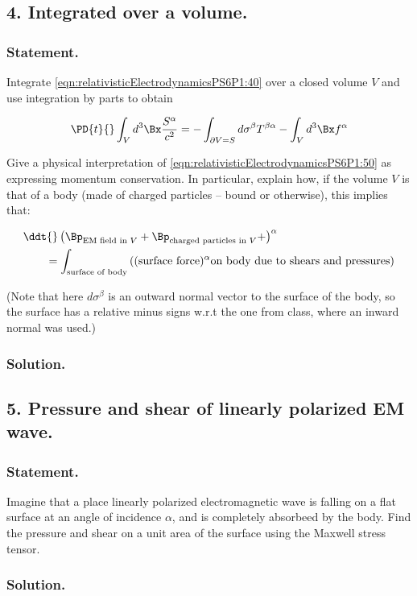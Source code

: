 \subsection{4. Integrated over a volume.}

\subsubsection{Statement.}

Integrate \ref{eqn:relativisticElectrodynamicsPS6P1:40} over a closed volume $V$ and use integration by parts to obtain

\begin{equation}\label{eqn:relativisticElectrodynamicsPS6P1:50}
\PD{t}{} \int_V d^3 \Bx \frac{S^\alpha}{c^2} 
= 
- \int_{\partial V = S} d \sigma^\beta T^{\beta \alpha} - \int_V d^3 \Bx f^\alpha 
\end{equation}

Give a physical interpretation of \ref{eqn:relativisticElectrodynamicsPS6P1:50} as expressing momentum conservation.  In particular, explain how, if the volume $V$ is that of a body (made of charged particles -- bound or otherwise), this implies that:

\begin{equation}\label{eqn:relativisticElectrodynamicsPS6P1:60}
\begin{aligned}
&\ddt{} \left( 
\Bp_{\text{EM field in $V$}} + 
\Bp_{\text{charged particles in $V$}} + 
\right)^\alpha \\
&\qquad = \int_{\text{surface of body}} \left( 
(\text{surface force})^\alpha \text{on body due to shears and pressures}
\right)
\end{aligned}
\end{equation}

(Note that here $d \sigma^\beta$ is an outward normal vector to the surface of the body, so the surface has a relative minus signs w.r.t the one from class, where an inward normal was used.)

\subsubsection{Solution.}

\subsection{5. Pressure and shear of linearly polarized EM wave.}

\subsubsection{Statement.}

Imagine that a place linearly polarized electromagnetic wave is falling on a flat surface at an angle of incidence $\alpha$, and is completely absorbeed by the body.  Find the pressure and shear on a unit area of the surface using the Maxwell stress tensor.

\subsubsection{Solution.}

